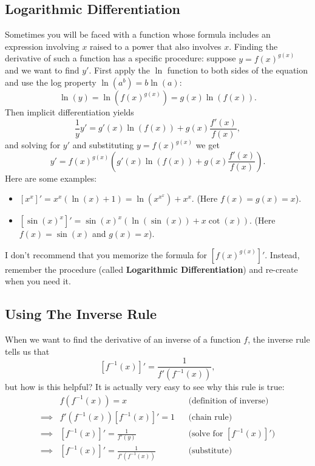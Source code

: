 \documentclass{article}
\newcommand{\mar}[1]{\marginpar{\begin{tcolorbox}[colback=white, arc=0in, left=1mm, right=1mm, leftrule=.3em, bottomrule=.05em, rightrule=.05em, toprule=.05em, halign=flush left]#1\end{tcolorbox}}}
\theoremstyle{definition}
\theoremstyle{definition}
\begin{document}
\subsection{Logarithmic Differentiation}

Sometimes you will be faced with a function whose formula includes an expression involving $x$ raised to a power that also involves $x$. Finding the derivative of such a function has a specific procedure: suppose $y=f(x)^{g(x)}$ and we want to find $y'$. First apply the $\ln$ function to both sides of the equation and use the log property $\ln(a^b)=b\ln(a)$:
$$\ln(y)=\ln(f(x)^{g(x)})=g(x)\ln(f(x)).$$
Then implicit differentiation yields
$$\frac{1}{y}y'=g'(x)\ln(f(x))+g(x)\frac{f'(x)}{f(x)},$$
and solving for $y'$ and substituting $y=f(x)^{g(x)}$ we get
$$y'=f(x)^{g(x)}\left(g'(x)\ln(f(x))+g(x)\frac{f'(x)}{f(x)}\right).$$
Here are some examples:
\begin{itemize}
\item $[x^x]'=x^x(\ln(x)+1)=\ln(x^{x^x})+x^x$. (Here $f(x)=g(x)=x$).
\item $[\sin(x)^x]'=\sin(x)^x(\ln(\sin(x))+x\cot(x))$. (Here $f(x)=\sin(x)$ and $g(x)=x$). \mar{Work these examples out.}
\end{itemize}

I don't recommend that you memorize the formula for $[f(x)^{g(x)}]'$. Instead, remember the procedure (called \textbf{Logarithmic Differentiation}) and re-create when you need it.


\subsection{Using The Inverse Rule}

When we want to find the derivative of an inverse of a function $f$, the inverse rule tells us that
$$[f^{-1}(x)]'=\frac{1}{f'(f^{-1}(x))},$$
but how is this helpful? It is actually very easy to see why this rule is true:
\begin{align*}
         & f(f^{-1}(x)) = x & & \text{(definition of inverse)}\\
\implies & f'(f^{-1}(x))[f^{-1}(x)]'=1 & &\text{(chain rule)}\\
\implies & [f^{-1}(x)]' = \frac{1}{f'(y)} & & \text{(solve for $[f^{-1}(x)]'$)}\\
\implies & [f^{-1}(x)]' =\frac{1}{f'(f^{-1}(x))} & & \text{(substitute)}
\end{align*}
\end{document}
